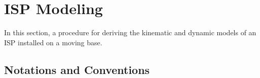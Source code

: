 \section{ISP Modeling}
\label{sec:modeling}

In this section, a procedure for deriving the kinematic and dynamic models of an ISP installed on a moving base. 

\subsection{Notations and Conventions}
\label{sec:definitions}

